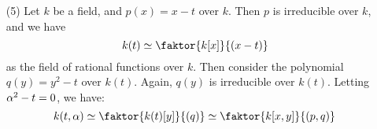\begin{example}
\begin{enumerate}
    \item[(5)] Let $k$ be a field, and $p(x)=x-t$ over $k$. Then  $p$
      is irreducible over $k$, and we have
      \begin{equation*}
        k(t) \simeq \faktor{k[x]}{(x-t)}
      \end{equation*}
      as the field of rational functions over $k$. Then consider the
      polynomial  $q(y)=y^2-t$ over $k(t)$. Again, $q(y)$ is
      irreducible over $k(t)$. Letting $\alpha^2-t=0$, we have:
      \begin{equation*}
        k(t,\a) \simeq \faktor{k(t)[y]}{(q)} \simeq
        \faktor{k[x,y]}{(p,q)}
      \end{equation*}
  \end{enumerate}
\end{example}

